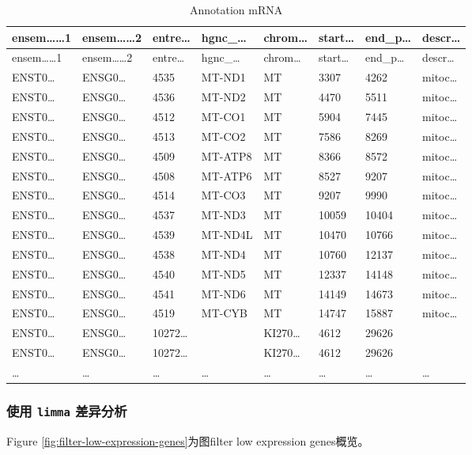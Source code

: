 \documentclass[
]{article}
\begin{document}
\begin{longtable}[]{@{}llllllll@{}}
\caption{\label{tab:annotation-mRNA}Annotation mRNA}\tabularnewline
\toprule
ensem\ldots\ldots1 & ensem\ldots\ldots2 & entre\ldots{} & hgnc\_\ldots{} & chrom\ldots{} & start\ldots{} & end\_p\ldots{} & descr\ldots{}\tabularnewline
\midrule
\endfirsthead
\toprule
ensem\ldots\ldots1 & ensem\ldots\ldots2 & entre\ldots{} & hgnc\_\ldots{} & chrom\ldots{} & start\ldots{} & end\_p\ldots{} & descr\ldots{}\tabularnewline
\midrule
\endhead
ENST0\ldots{} & ENSG0\ldots{} & 4535 & MT-ND1 & MT & 3307 & 4262 & mitoc\ldots{}\tabularnewline
ENST0\ldots{} & ENSG0\ldots{} & 4536 & MT-ND2 & MT & 4470 & 5511 & mitoc\ldots{}\tabularnewline
ENST0\ldots{} & ENSG0\ldots{} & 4512 & MT-CO1 & MT & 5904 & 7445 & mitoc\ldots{}\tabularnewline
ENST0\ldots{} & ENSG0\ldots{} & 4513 & MT-CO2 & MT & 7586 & 8269 & mitoc\ldots{}\tabularnewline
ENST0\ldots{} & ENSG0\ldots{} & 4509 & MT-ATP8 & MT & 8366 & 8572 & mitoc\ldots{}\tabularnewline
ENST0\ldots{} & ENSG0\ldots{} & 4508 & MT-ATP6 & MT & 8527 & 9207 & mitoc\ldots{}\tabularnewline
ENST0\ldots{} & ENSG0\ldots{} & 4514 & MT-CO3 & MT & 9207 & 9990 & mitoc\ldots{}\tabularnewline
ENST0\ldots{} & ENSG0\ldots{} & 4537 & MT-ND3 & MT & 10059 & 10404 & mitoc\ldots{}\tabularnewline
ENST0\ldots{} & ENSG0\ldots{} & 4539 & MT-ND4L & MT & 10470 & 10766 & mitoc\ldots{}\tabularnewline
ENST0\ldots{} & ENSG0\ldots{} & 4538 & MT-ND4 & MT & 10760 & 12137 & mitoc\ldots{}\tabularnewline
ENST0\ldots{} & ENSG0\ldots{} & 4540 & MT-ND5 & MT & 12337 & 14148 & mitoc\ldots{}\tabularnewline
ENST0\ldots{} & ENSG0\ldots{} & 4541 & MT-ND6 & MT & 14149 & 14673 & mitoc\ldots{}\tabularnewline
ENST0\ldots{} & ENSG0\ldots{} & 4519 & MT-CYB & MT & 14747 & 15887 & mitoc\ldots{}\tabularnewline
ENST0\ldots{} & ENSG0\ldots{} & 10272\ldots{} & & KI270\ldots{} & 4612 & 29626 &\tabularnewline
ENST0\ldots{} & ENSG0\ldots{} & 10272\ldots{} & & KI270\ldots{} & 4612 & 29626 &\tabularnewline
\ldots{} & \ldots{} & \ldots{} & \ldots{} & \ldots{} & \ldots{} & \ldots{} & \ldots{}\tabularnewline
\bottomrule
\end{longtable}

\hypertarget{diff}{%
\subsubsection{\texorpdfstring{使用 \texttt{limma} 差异分析}{使用 limma 差异分析}}\label{diff}}

Figure \ref{fig:filter-low-expression-genes}为图filter low expression genes概览。
\end{document}
